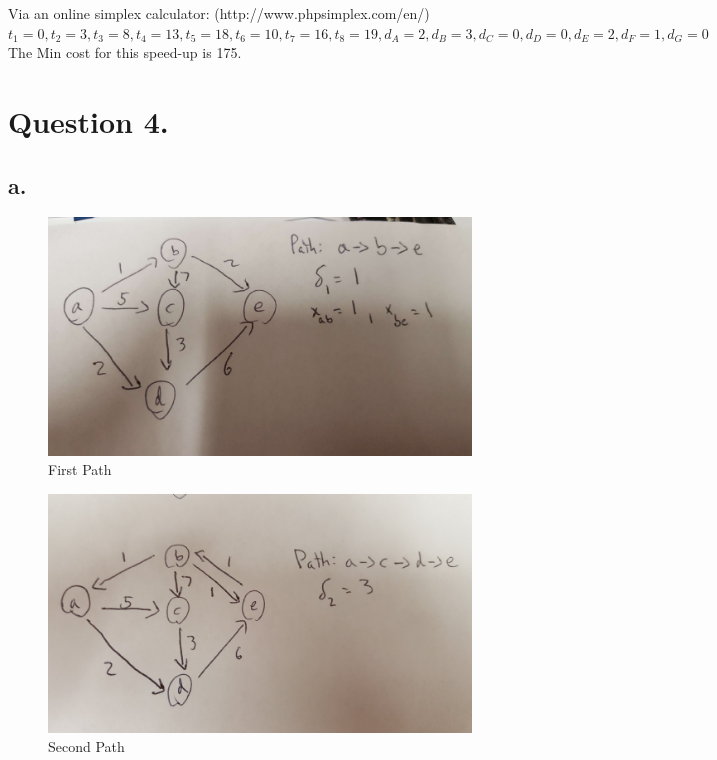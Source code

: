 \documentclass[10pt, letterpaper]{paper}
\begin{document}
Via an online simplex calculator: (http://www.phpsimplex.com/en/)
\newline
$t_1 = 0, t_2 = 3, t_3 = 8, t_4 = 13, t_5 = 18, t_6 = 10, t_7 = 16, t_8 = 19, d_A = 2, d_B = 3, d_C = 0, d_D = 0, d_E = 2, d_F = 1, d_G = 0$
\newline
The Min cost for this speed-up is 175.

\section*{Question 4.}
\subsection*{a.}
\begin{figure}[H]
\centering
\includegraphics[width=1.0\textwidth]{FirstPath.jpeg}
\caption{ First Path }
\end{figure}
\begin{figure}[H]
\centering
\includegraphics[width=1.0\textwidth]{SecondPath.jpeg}
\caption{ Second Path }
\end{figure}
\end{document}
